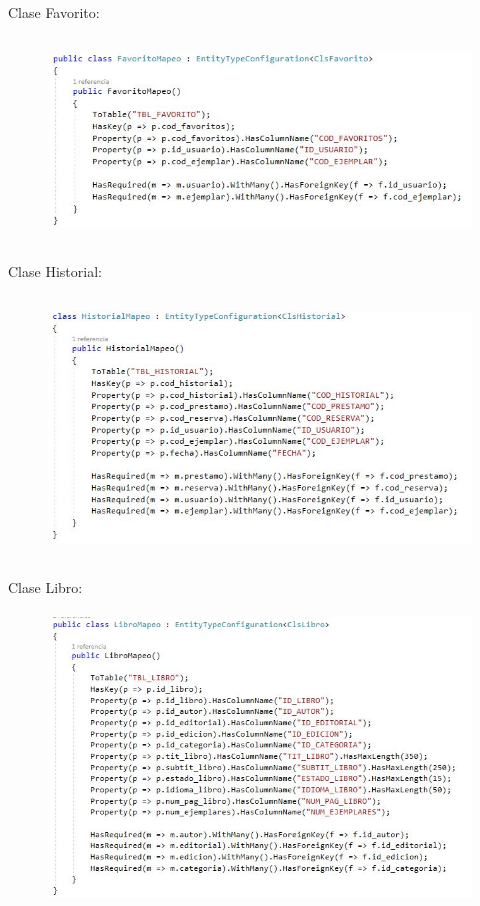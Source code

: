 \documentclass[12pt]{article}
\begin{document}
\begin{enumerate}[label*=\arabic*.]
\begin{enumerate}[label*=\arabic*.]
\newpage
Clase Favorito:
\begin{figure}[H]
	\begin{Center}
		\includegraphics[width=5.91in,height=2.15in]{./media/favoritoMap.jpg}
	\end{Center}
\end{figure}


Clase Historial:
\begin{figure}[H]
	\begin{Center}
		\includegraphics[width=5.91in,height=2.75in]{./media/historialMap.jpg}
	\end{Center}
\end{figure}


Clase Libro:
\begin{figure}[H]
	\begin{Center}
		\includegraphics[width=5.91in,height=3.05in]{./media/libroMap.jpg}
	\end{Center}
\end{figure}



\end{enumerate}
\end{enumerate}
\end{document}

